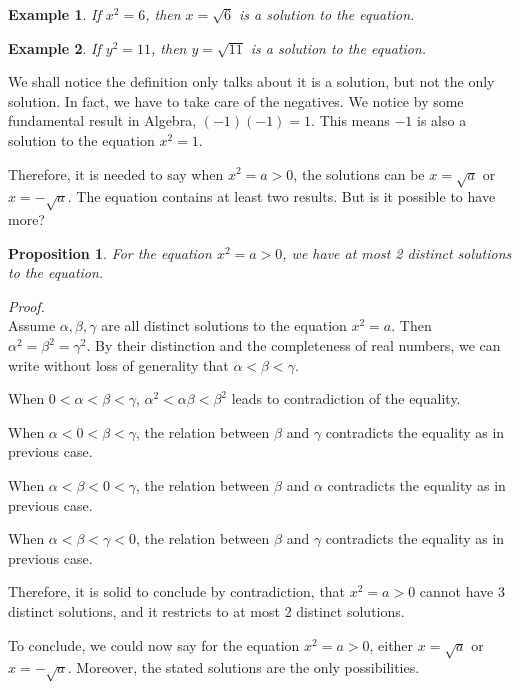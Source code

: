 \documentclass[12pt]{article}
\newtheorem*{proposition}{Proposition}
\newtheorem*{example}{Example}
\renewenvironment{proof}[1][Proof]{\begin{snugshade*} \textit{{#1}.}\\}{\hfill \qedsymbol \end{snugshade*}}
\begin{document}
    \begin{example}
        If $x^2=6$, then $x=\sqrt{6}$ is a solution to the equation.
    \end{example}

    \begin{example}
        If $y^2=11$, then $y=\sqrt{11}$ is a solution to the equation.
    \end{example}

    We shall notice the definition only talks about it is a solution, but not the only solution. In fact, we have to take care of the negatives. We notice by some fundamental result in Algebra, $(-1)(-1)=1$. This means $-1$ is also a solution to the equation $x^2=1$.

    Therefore, it is needed to say when $x^2=a>0$, the solutions can be $x=\sqrt{a}$ or $x=-\sqrt{a}$. The equation contains at least two results. But is it possible to have more?

    \begin{proposition}
        For the equation $x^2=a>0$, we have at most 2 distinct solutions to the equation. 
    \end{proposition}

    \begin{proof}
        Assume $\alpha,\beta,\gamma$ are all distinct solutions to the equation $x^2=a$. Then $\alpha^2=\beta^2=\gamma^2$. By their distinction and the completeness of real numbers, we can write without loss of generality that $\alpha<\beta<\gamma$.

        When $0<\alpha<\beta<\gamma$, $\alpha^2<\alpha\beta<\beta^2$ leads to contradiction of the equality.

        When $\alpha<0<\beta<\gamma$, the relation between $\beta$ and $\gamma$ contradicts the equality as in previous case.

        When $\alpha<\beta<0<\gamma$, the relation between $\beta$ and $\alpha$ contradicts the equality as in previous case.

        When $\alpha<\beta<\gamma<0$, the relation between $\beta$ and $\gamma$ contradicts the equality as in previous case.

        Therefore, it is solid to conclude by contradiction, that $x^2=a>0$ cannot have 3 distinct solutions, and it restricts to at most 2 distinct solutions.
    \end{proof}

    To conclude, we could now say for the equation $x^2=a>0$, either $x=\sqrt{a}$ or $x=-\sqrt{a}$. Moreover, the stated solutions are the only possibilities.
\end{document}
